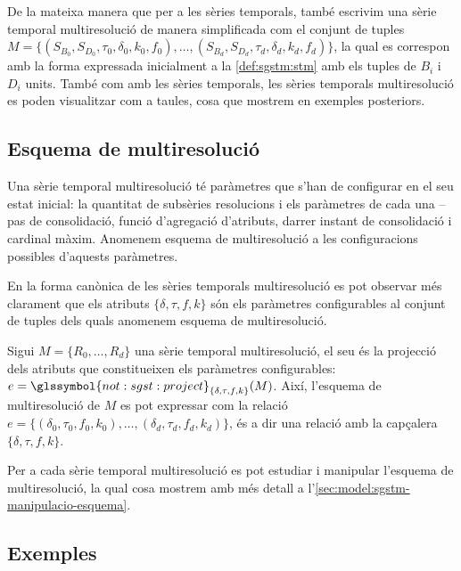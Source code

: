 De la mateixa manera que per a les sèries temporals, també escrivim
una sèrie temporal multiresolució de manera simplificada com el
conjunt de tuples $M = \{ (S_{B_0}, S_{D_0} , \tau_0, \delta_0, k_0,
f_0 ), \dotsc, (S_{B_d}, S_{D_d} , \tau_d, \delta_d, k_d, f_d ) \}$,
la qual es correspon amb la forma expressada inicialment a la
\autoref{def:sgstm:stm} amb els tuples de $B_i$ i $D_i$ units.  També
com amb les sèries temporals, les sèries temporals multiresolució es
poden visualitzar com a taules, cosa que mostrem en exemples
posteriors.






\subsection{Esquema de multiresolució}

Una sèrie temporal multiresolució té paràmetres que
s'han de configurar en el seu estat inicial: la quantitat de subsèries
resolucions i els paràmetres de cada una --pas de consolidació, funció
d'agregació d'atributs, darrer instant de consolidació i cardinal
màxim. Anomenem esquema de multiresolució a les configuracions
possibles d'aquests paràmetres.


En la forma canònica de les sèries temporals multiresolució es pot
observar més clarament que els atributs $\{\delta,\tau,f,k\}$ són els
paràmetres configurables al conjunt de tuples dels quals anomenem
esquema de multiresolució.
\begin{definition}
  \label{def:sgstm:esquema}
  Sigui $M=\{R_0,\dotsc,R_d\}$ una sèrie temporal multiresolució, el
  seu  és la
  projecció dels atributs que constitueixen els paràmetres
  configurables:
  $e=\glssymbol{not:sgst:project}_{\{\delta,\tau,f,k\}}(M)$. Així,
  l'esquema de multiresolució de $M$ es pot expressar com la relació
  $e = \{ (\delta_0,\tau_0,f_0,k_0), \dotsc,
  (\delta_d,\tau_d,f_d,k_d)\}$, és a dir una relació amb la capçalera
  $\{\delta,\tau,f,k\}$.
\end{definition}


Per a cada sèrie temporal multiresolució es pot estudiar i manipular
l'esquema de multiresolució, la qual cosa mostrem amb més detall a
l'\autoref{sec:model:sgstm-manipulacio-esquema}.





\subsection{Exemples}


